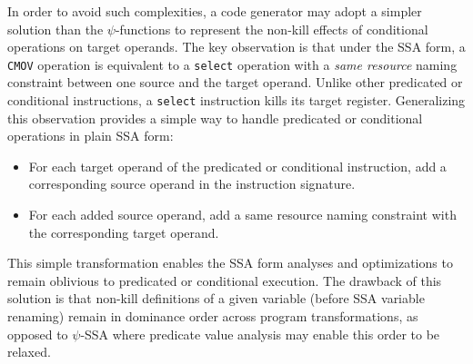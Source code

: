 In order to avoid such complexities, a code generator may adopt a simpler solution than
the $\psi$-functions to represent the non-kill effects of
conditional operations on target operands. The key observation is that under the SSA form,
a \texttt{CMOV} operation is equivalent to a \texttt{select}
operation with a \emph{same resource} naming constraint between one source and the
target operand. Unlike other predicated or conditional instructions, a \texttt{select}
instruction kills its target register.  Generalizing this observation provides a
simple way to handle predicated or conditional operations in plain SSA form:
\begin{itemize}

\item For each target operand of the predicated or conditional instruction, add
a corresponding source operand in the instruction signature.

\item For each added source operand, add a {same resource} naming constraint
with the corresponding target operand.

\end{itemize}
This simple transformation enables the SSA form analyses and optimizations to
remain oblivious to predicated or conditional execution. The drawback of this
solution is that non-kill definitions of a given variable (before SSA variable
renaming) remain in dominance order across program transformations, as opposed
to $\psi$-SSA where predicate value analysis may enable this order to be relaxed.



